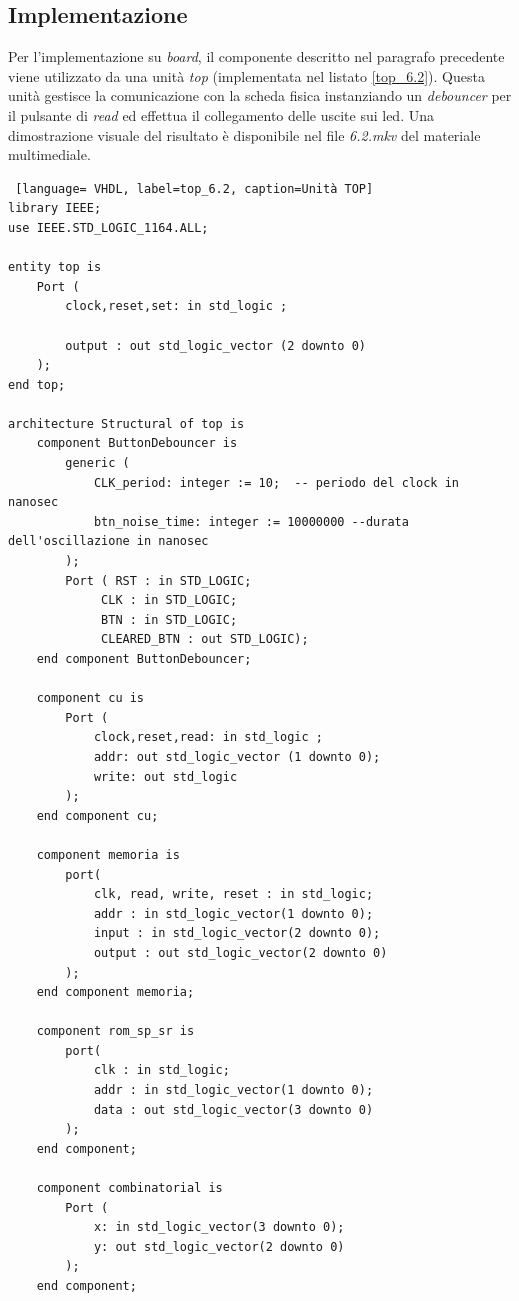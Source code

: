 \subsection{Implementazione}
Per l'implementazione su \textit{board}, il componente descritto nel paragrafo precedente viene utilizzato da una unità \textit{top} (implementata nel listato \ref{top_6.2}). Questa unità gestisce la comunicazione con la scheda fisica instanziando un \textit{debouncer} per il pulsante di \textit{read} ed effettua il collegamento delle uscite sui led. Una dimostrazione visuale del risultato è disponibile nel file \textit{6.2.mkv} del materiale multimediale.

\begin{lstlisting} [language= VHDL, label=top_6.2, caption=Unità TOP]
library IEEE;
use IEEE.STD_LOGIC_1164.ALL;

entity top is
    Port (
        clock,reset,set: in std_logic ;

        output : out std_logic_vector (2 downto 0)
    );
end top;

architecture Structural of top is
    component ButtonDebouncer is
        generic (
            CLK_period: integer := 10;  -- periodo del clock in nanosec
            btn_noise_time: integer := 10000000 --durata dell'oscillazione in nanosec
        );
        Port ( RST : in STD_LOGIC;
             CLK : in STD_LOGIC;
             BTN : in STD_LOGIC;
             CLEARED_BTN : out STD_LOGIC);
    end component ButtonDebouncer;

    component cu is
        Port (
            clock,reset,read: in std_logic ;
            addr: out std_logic_vector (1 downto 0);
            write: out std_logic
        );
    end component cu;

    component memoria is
        port(
            clk, read, write, reset : in std_logic;
            addr : in std_logic_vector(1 downto 0);
            input : in std_logic_vector(2 downto 0);
            output : out std_logic_vector(2 downto 0)
        );
    end component memoria;

    component rom_sp_sr is
        port(
            clk : in std_logic;
            addr : in std_logic_vector(1 downto 0);
            data : out std_logic_vector(3 downto 0)
        );
    end component;

    component combinatorial is
        Port (
            x: in std_logic_vector(3 downto 0);
            y: out std_logic_vector(2 downto 0)
        );
    end component;


\end{lstlisting}
